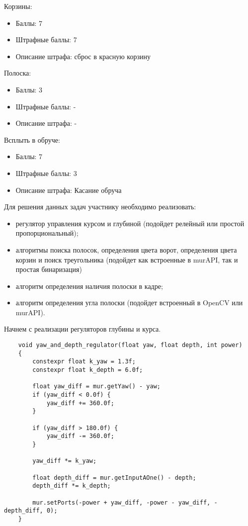 Корзины:
\begin{itemize}
    \item Баллы: 7
    \item Штрафные баллы: 7
    \item Описание штрафа: сброс в красную корзину
\end{itemize}

Полоска:
\begin{itemize}
    \item Баллы: 3
    \item Штрафные баллы: -
    \item Описание штрафа: -
\end{itemize}

Всплыть в обруче:
\begin{itemize}
    \item Баллы: 7
    \item Штрафные баллы: 3
    \item Описание штрафа: Касание обруча
\end{itemize}

\solutionSection

Для решения данных задач участнику необходимо реализовать:

\begin{itemize}
    \item регулятор управления курсом и глубиной (подойдет релейный или простой пропорциональный);
    \item алгоритмы поиска полосок, определения цвета ворот, определения цвета корзин и поиск треугольника (подойдет как встроенные в murAPI, так и простая бинаризация)  
    \item алгоритм определения наличия полоски в кадре;
    \item алгоритм определения угла полоски (подойдет встроенный в OpenCV или murAPI).
\end{itemize}

Начнем с реализации регуляторов глубины и курса.

\begin{verbatim}
    void yaw_and_depth_regulator(float yaw, float depth, int power)
    {
        constexpr float k_yaw = 1.3f;
        constexpr float k_depth = 6.0f;

        float yaw_diff = mur.getYaw() - yaw;
        if (yaw_diff < 0.0f) {
            yaw_diff += 360.0f;
        }

        if (yaw_diff > 180.0f) {
            yaw_diff -= 360.0f;
        }

        yaw_diff *= k_yaw;

        float depth_diff = mur.getInputAOne() - depth;
        depth_diff *= k_depth;

        mur.setPorts(-power + yaw_diff, -power - yaw_diff, -depth_diff, 0);
    }
\end{verbatim}

